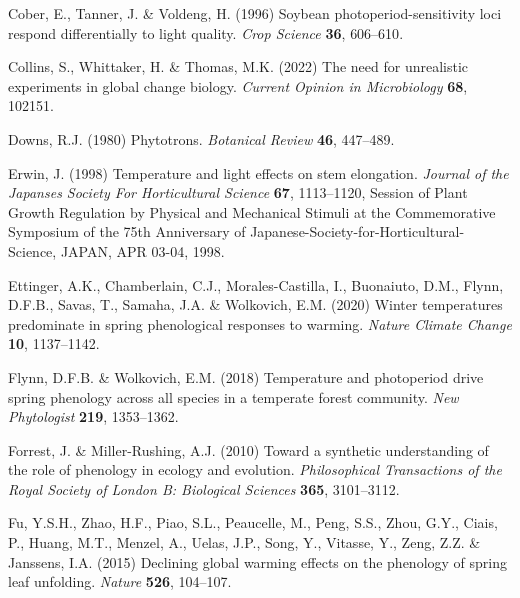\documentclass[11pt]{article}
\begin{document}
\begin{thebibliography}{49}
Cober, E., Tanner, J. \& Voldeng, H. ({1996}) {Soybean photoperiod-sensitivity
  loci respond differentially to light quality}. \emph{{Crop Science}}
  \textbf{{36}}, {606--610}.

Collins, S., Whittaker, H. \& Thomas, M.K. (2022) The need for unrealistic
  experiments in global change biology. \emph{Current Opinion in Microbiology}
  \textbf{68}, 102151.

Downs, R.J. (1980) Phytotrons. \emph{Botanical Review} \textbf{46}, 447--489.

Erwin, J. ({1998}) {Temperature and light effects on stem elongation}.
  \emph{{Journal of the Japanses Society For Horticultural Science}}
  \textbf{{67}}, {1113--1120}, {Session of Plant Growth Regulation by Physical
  and Mechanical Stimuli at the Commemorative Symposium of the 75th Anniversary
  of Japanese-Society-for-Horticultural-Science, JAPAN, APR 03-04, 1998}.

Ettinger, A.K., Chamberlain, C.J., Morales-Castilla, I., Buonaiuto, D.M.,
  Flynn, D.F.B., Savas, T., Samaha, J.A. \& Wolkovich, E.M. (2020) Winter
  temperatures predominate in spring phenological responses to warming.
  \emph{Nature Climate Change} \textbf{10}, 1137--1142.

Flynn, D.F.B. \& Wolkovich, E.M. (2018) Temperature and photoperiod drive
  spring phenology across all species in a temperate forest community.
  \emph{New Phytologist} \textbf{219}, 1353--1362.

Forrest, J. \& Miller-Rushing, A.J. (2010) Toward a synthetic understanding of
  the role of phenology in ecology and evolution. \emph{Philosophical
  Transactions of the Royal Society of London B: Biological Sciences}
  \textbf{365}, 3101--3112.

Fu, Y.S.H., Zhao, H.F., Piao, S.L., Peaucelle, M., Peng, S.S., Zhou, G.Y.,
  Ciais, P., Huang, M.T., Menzel, A., Uelas, J.P., Song, Y., Vitasse, Y., Zeng,
  Z.Z. \& Janssens, I.A. (2015) Declining global warming effects on the
  phenology of spring leaf unfolding. \emph{Nature} \textbf{526}, 104--107.


\end{thebibliography}
\end{document}
